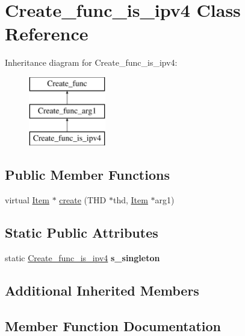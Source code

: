 \hypertarget{classCreate__func__is__ipv4}{}\section{Create\+\_\+func\+\_\+is\+\_\+ipv4 Class Reference}
\label{classCreate__func__is__ipv4}
Inheritance diagram for Create\+\_\+func\+\_\+is\+\_\+ipv4\+:\begin{figure}[H]
\begin{center}
\leavevmode
\includegraphics[height=3.000000cm]{classCreate__func__is__ipv4}
\end{center}
\end{figure}
\subsection*{Public Member Functions}
\begin{DoxyCompactItemize}
\item 
virtual \mbox{\hyperlink{classItem}{Item}} $\ast$ \mbox{\hyperlink{classCreate__func__is__ipv4_a80ff33f57b08e0c7864ba5d1decb69f2}{create}} (T\+HD $\ast$thd, \mbox{\hyperlink{classItem}{Item}} $\ast$arg1)
\end{DoxyCompactItemize}
\subsection*{Static Public Attributes}
\begin{DoxyCompactItemize}
\item 
\mbox{\label{classCreate__func__is__ipv4_a86f2112df55cb0e86a1b0909a16b1a1e}} 
static \mbox{\hyperlink{classCreate__func__is__ipv4}{Create\+\_\+func\+\_\+is\+\_\+ipv4}} {\bfseries s\+\_\+singleton}
\end{DoxyCompactItemize}
\subsection*{Additional Inherited Members}


\subsection{Member Function Documentation}
\mbox{\label{classCreate__func__is__ipv4_a80ff33f57b08e0c7864ba5d1decb69f2}} 

